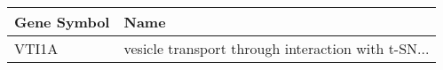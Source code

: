 \begin{tabular}{ll}
\toprule
Gene Symbol &                                               Name \\
\midrule
      VTI1A & vesicle transport through interaction with t-SN... \\
\bottomrule
\end{tabular}
